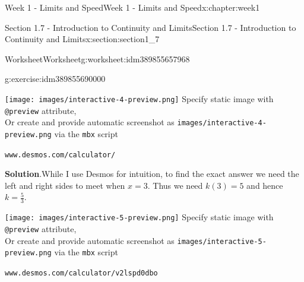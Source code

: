 \documentclass[oneside,10pt,]{book}
\newcommand{\blocktitlefont}{\relax}
\newcommand{\mono}[1]{\texttt{#1}}
\numberwithin{equation}{section}
\newlength{\qrsize}
\newlength{\previewwidth}
\begin{document}
\begin{chapterptx}{Week 1 - Limits and Speed}{}{Week 1 - Limits and Speed}{}{}{x:chapter:week1}
\begin{sectionptx}{Section 1.7 - Introduction to Continuity and Limits}{}{Section 1.7 - Introduction to Continuity and Limits}{}{}{x:section:section1_7}
\begin{worksheet-subsection}{Worksheet}{}{Worksheet}{}{}{g:worksheet:idm389855657968}
\begin{divisionexercise}{2}{}{}{g:exercise:idm389855690000}
\begin{tcbraster}[raster columns=2, raster column skip=1pt, raster halign=center, raster force size=false, raster left skip=0pt, raster right skip=0pt]%
\begin{tcolorbox}[previewstyle, width=\previewwidth]%
%
{\texttt{[image: images/interactive-4-preview.png]}}%
{\small{}Specify static image with \mono{@preview} attribute,\\Or create and provide automatic screenshot as \mono{images/interactive-4-preview.png} via the \mono{mbx} script}%
\end{tcolorbox}%
\begin{tcolorbox}[qrstyle]%
{\hypersetup{urlcolor=black}}%
\end{tcolorbox}%
\begin{tcolorbox}[captionstyle]%
\small \mono{www.desmos.com/calculator/}\end{tcolorbox}%
\end{tcbraster}%
%
\textbf{\blocktitlefont Solution}.\hypertarget{g:solution:idm389855717648}{}\quad{}While I use Desmos for intuition, to find the exact answer we need the left and right sides to meet when \(x=3\). Thus we need \(k(3)=5\) and hence \(k=\frac 53\).%
\par
\setlength{\qrsize}{9em}
\setlength{\previewwidth}{\linewidth}
\addtolength{\previewwidth}{-\qrsize}
\begin{tcbraster}[raster columns=2, raster column skip=1pt, raster halign=center, raster force size=false, raster left skip=0pt, raster right skip=0pt]%
\begin{tcolorbox}[previewstyle, width=\previewwidth]%
%
{\texttt{[image: images/interactive-5-preview.png]}}%
{\small{}Specify static image with \mono{@preview} attribute,\\Or create and provide automatic screenshot as \mono{images/interactive-5-preview.png} via the \mono{mbx} script}%
\end{tcolorbox}%
\begin{tcolorbox}[qrstyle]%
{\hypersetup{urlcolor=black}}%
\end{tcolorbox}%
\begin{tcolorbox}[captionstyle]%
\small \mono{www.desmos.com/calculator/v2lspd0dbo}\end{tcolorbox}%
\end{tcbraster}%
%
\end{divisionexercise}%

\end{worksheet-subsection}
\end{sectionptx}
\end{chapterptx}
\end{document}
